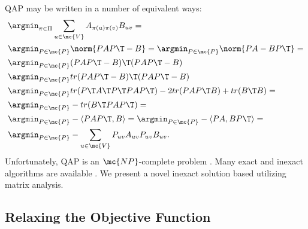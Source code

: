\documentclass[10pt,journal,cspaper,compsoc]{IEEEtran}
\newcommand{\PmcP}{P \in \mc{P}}
\begin{document}
QAP may be written in a number of equivalent ways:
\begin{align}
	 &\argmin_{\pi \in \Pi} \sum_{u \in \mc{V}} A_{\pi(u) \pi(v)} B_{uv} =\nonumber\\
	&\argmin_{\PmcP} \norm{PAP\T - B} =
	\argmin_{\PmcP} \norm{PA - BP\T} =\nonumber\\
	&\argmin_{\PmcP} (PAP\T-B)\T (PAP\T-B) \nonumber\\ 
	&\argmin_{\PmcP} tr(PAP\T - B)\T (PAP\T - B) \nonumber \\
	&\argmin_{\PmcP}  tr(P\T A\T P\T P A P\T) - 2tr(PAP\T B) + tr(B\T B)  =\nonumber \\ %
	&\argmin_{\PmcP} - tr(B\T PAP\T)=\nonumber\\ %
	&\argmin_{\PmcP}  -\langle PAP\T, B \rangle =
	\argmin_{\PmcP}  -\langle PA, BP\T \rangle =\nonumber\\
	&\argmin_{\PmcP}  -\sum_{u \in \mc{V}} P_{uv} A_{uv} P_{uv} B_{uv}. \label{eq:qap}
\end{align}
Unfortunately, QAP is an $\mc{NP}$-complete problem \cite{Garey1979}.   Many exact and inexact algorithms are available \cite{Burkard2009}.  We present a novel inexact solution based utilizing matrix analysis.


\subsection{Relaxing the Objective Function} %
\label{sub:relaxing_the_objective_function}

\end{document}
